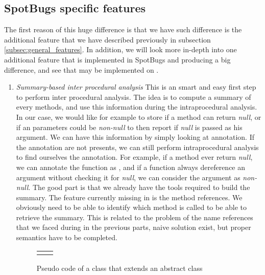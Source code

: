 \subsection{SpotBugs specific features}
\label{subsec:spotbugs_specific}

The first reason of this huge difference is that we have such difference is the additional feature that we have described previously in subsection \ref{subsec:general_features}.
In addition, we will look more in-depth into one additional feature that is implemented in SpotBugs and producing a big difference, and see that may be implemented on \slang{}.

\begin{enumerate}
	\item \textit{Summary-based inter procedural analysis} \newline
	This is an smart and easy first step to perform inter procedural analysis.
	The idea is to compute a summary of every methods, and use this information during the intraprocedural analysis. 
	In our case, we would like for example to store if a method can return \emph{null}, or if an parameters could be \emph{non-null} to then report if \emph{null} is passed as his argument. 
	We can have this information by simply looking at annotation. If the annotation are not presents, we can still perform intraprocedural analysis to find ourselves the annotation. For example, if a method ever return \emph{null}, we can annotate the function as \nullable{}, and if a function always dereference an argument without checking it for \emph{null}, we can consider the argument as \emph{non-null}. 
	The good part is that we already have the tools required to build the summary. The feature currently missing in \slang{} is the method references. 
	We obviously need to be able to identify which method is called to be able to retrieve the summary.
	This is related to the problem of the name references that we faced during in the previous parts, naive solution exist, but proper semantics have to be completed.	


\begin{figure}[h]
	\centering
	\caption{Pseudo code of a class that extends an abstract class}
	\label{figure:class-extends-abtract}
	\setlength{\tabcolsep}{24pt}
	\begin{tabular}{cc}
		\multicolumn{1}{c}{} & \multicolumn{1}{c}{} \\
	\end{tabular}
\end{figure}
	

\end{enumerate}
